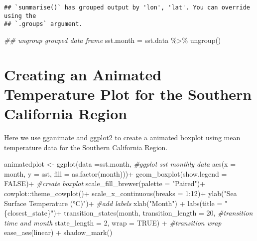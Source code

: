 \documentclass[]{tufte-handout}
\newenvironment{Shaded}{}{}
\newcommand{\AttributeTok}[1]{\textcolor[rgb]{0.49,0.56,0.16}{#1}}
\newcommand{\CommentTok}[1]{\textcolor[rgb]{0.38,0.63,0.69}{\textit{#1}}}
\newcommand{\ConstantTok}[1]{\textcolor[rgb]{0.53,0.00,0.00}{#1}}
\newcommand{\DecValTok}[1]{\textcolor[rgb]{0.25,0.63,0.44}{#1}}
\newcommand{\DocumentationTok}[1]{\textcolor[rgb]{0.73,0.13,0.13}{\textit{#1}}}
\newcommand{\FunctionTok}[1]{\textcolor[rgb]{0.02,0.16,0.49}{#1}}
\newcommand{\NormalTok}[1]{#1}
\newcommand{\OtherTok}[1]{\textcolor[rgb]{0.00,0.44,0.13}{#1}}
\newcommand{\SpecialCharTok}[1]{\textcolor[rgb]{0.25,0.44,0.63}{#1}}
\newcommand{\StringTok}[1]{\textcolor[rgb]{0.25,0.44,0.63}{#1}}
\begin{document}
\begin{verbatim}
## `summarise()` has grouped output by 'lon', 'lat'. You can override using the
## `.groups` argument.
\end{verbatim}

\begin{Shaded}
\begin{Highlighting}[]
\DocumentationTok{\#\# ungroup grouped data frame}
\NormalTok{sst.month }\OtherTok{=}\NormalTok{ sst.data }\SpecialCharTok{\%\textgreater{}\%} \FunctionTok{ungroup}\NormalTok{()}
\end{Highlighting}
\end{Shaded}

\hypertarget{creating-an-animated-temperature-plot-for-the-southern-california-region}{%
\section{Creating an Animated Temperature Plot for the Southern
California
Region}\label{creating-an-animated-temperature-plot-for-the-southern-california-region}}

Here we use gganimate and ggplot2 to create a animated boxplot using
mean temperature data for the Southern California Region.

\begin{Shaded}
\begin{Highlighting}[]
\NormalTok{animatedplot }\OtherTok{\textless{}{-}} \FunctionTok{ggplot}\NormalTok{(}\AttributeTok{data =}\NormalTok{sst.month, }\CommentTok{\#ggplot sst monthly data}
       \FunctionTok{aes}\NormalTok{(}\AttributeTok{x =}\NormalTok{ month, }\AttributeTok{y =}\NormalTok{ sst, }\AttributeTok{fill =} \FunctionTok{as.factor}\NormalTok{(month)))}\SpecialCharTok{+}
  \FunctionTok{geom\_boxplot}\NormalTok{(}\AttributeTok{show.legend =} \ConstantTok{FALSE}\NormalTok{)}\SpecialCharTok{+} \CommentTok{\#create boxplot}
  \FunctionTok{scale\_fill\_brewer}\NormalTok{(}\AttributeTok{palette =} \StringTok{"Paired"}\NormalTok{)}\SpecialCharTok{+}
\NormalTok{  cowplot}\SpecialCharTok{::}\FunctionTok{theme\_cowplot}\NormalTok{()}\SpecialCharTok{+} 
  \FunctionTok{scale\_x\_continuous}\NormalTok{(}\AttributeTok{breaks =} \DecValTok{1}\SpecialCharTok{:}\DecValTok{12}\NormalTok{)}\SpecialCharTok{+}
  \FunctionTok{ylab}\NormalTok{(}\StringTok{"Sea Surface Temperature (°C)"}\NormalTok{)}\SpecialCharTok{+}  \CommentTok{\#add labels}
  \FunctionTok{xlab}\NormalTok{(}\StringTok{"Month"}\NormalTok{) }\SpecialCharTok{+}
  \FunctionTok{labs}\NormalTok{(}\AttributeTok{title =} \StringTok{"\{closest\_state\}"}\NormalTok{)}\SpecialCharTok{+}
  \FunctionTok{transition\_states}\NormalTok{(month, }\AttributeTok{transition\_length =} \DecValTok{20}\NormalTok{, }\CommentTok{\#transition time and month}
                    \AttributeTok{state\_length =} \DecValTok{2}\NormalTok{, }\AttributeTok{wrap =} \ConstantTok{TRUE}\NormalTok{) }\SpecialCharTok{+} \CommentTok{\#transition wrap}
  \FunctionTok{ease\_aes}\NormalTok{(}\StringTok{\textquotesingle{}linear\textquotesingle{}}\NormalTok{) }\SpecialCharTok{+}
  \FunctionTok{shadow\_mark}\NormalTok{()}
\end{Highlighting}
\end{Shaded}
\end{document}

